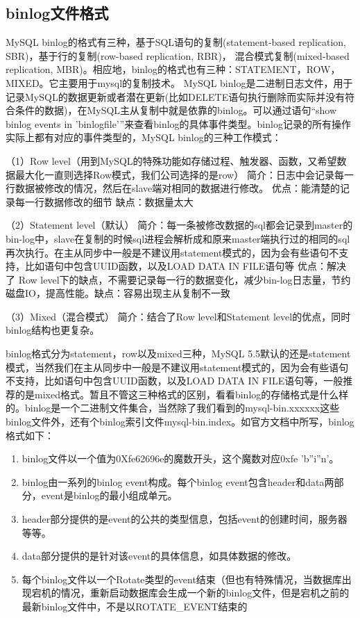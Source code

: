 \documentclass[../../../interview-questions.tex]{subfiles}
\begin{document}
\subsection{binlog文件格式}

MySQL binlog的格式有三种，基于SQL语句的复制(statement-based replication, SBR)，基于行的复制(row-based replication, RBR)，
混合模式复制(mixed-based replication, MBR)。相应地，binlog的格式也有三种：STATEMENT，ROW，MIXED。它主要用于mysql的复制技术。
MySQL binlog是二进制日志文件，用于记录MySQL的数据更新或者潜在更新(比如DELETE语句执行删除而实际并没有符合条件的数据)，在MySQL主从复制中就是依靠的binlog。可以通过语句“show binlog events in 'binlogfile'”来查看binlog的具体事件类型。binlog记录的所有操作实际上都有对应的事件类型的，MySQL binlog的三种工作模式：

（1）Row level（用到MySQL的特殊功能如存储过程、触发器、函数，又希望数据最大化一直则选择Row模式，我们公司选择的是row）
简介：日志中会记录每一行数据被修改的情况，然后在slave端对相同的数据进行修改。
优点：能清楚的记录每一行数据修改的细节
缺点：数据量太大

（2）Statement level（默认）
简介：每一条被修改数据的sql都会记录到master的bin-log中，slave在复制的时候sql进程会解析成和原来master端执行过的相同的sql再次执行。在主从同步中一般是不建议用statement模式的，因为会有些语句不支持，比如语句中包含UUID函数，以及LOAD DATA IN FILE语句等
优点：解决了 Row level下的缺点，不需要记录每一行的数据变化，减少bin-log日志量，节约磁盘IO，提高性能。缺点：容易出现主从复制不一致

（3）Mixed（混合模式）
简介：结合了Row level和Statement level的优点，同时binlog结构也更复杂。


binlog格式分为statement，row以及mixed三种，MySQL 5.5默认的还是statement模式，当然我们在主从同步中一般是不建议用statement模式的，因为会有些语句不支持，比如语句中包含UUID函数，以及LOAD DATA IN FILE语句等，一般推荐的是mixed格式。暂且不管这三种格式的区别，看看binlog的存储格式是什么样的。binlog是一个二进制文件集合，当然除了我们看到的mysql-bin.xxxxxx这些binlog文件外，还有个binlog索引文件mysql-bin.index。如官方文档中所写，binlog格式如下：

\begin{enumerate}
\item {binlog文件以一个值为0Xfe62696e的魔数开头，这个魔数对应0xfe 'b''i''n'。}
\item {binlog由一系列的binlog event构成。每个binlog event包含header和data两部分，event是binlog的最小组成单元。}
\item {header部分提供的是event的公共的类型信息，包括event的创建时间，服务器等等。}
\item {data部分提供的是针对该event的具体信息，如具体数据的修改。}
\item {每个binlog文件以一个Rotate类型的event结束（但也有特殊情况，当数据库出现宕机的情况，重新启动数据库会生成一个新的binlog文件，但是宕机之前的最新binlog文件中，不是以ROTATE\_EVENT结束的}
\end{enumerate}
\end{document}
